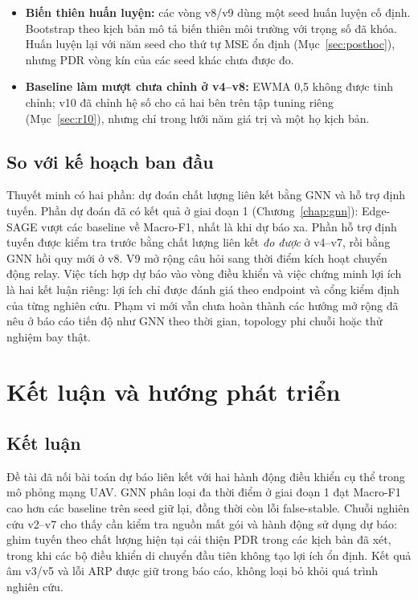 \documentclass[12pt,a4paper]{report}
\begin{document}
\begin{itemize}
  \item \textbf{Biến thiên huấn luyện:} các vòng v8/v9 dùng một seed huấn luyện cố định. Bootstrap theo kịch bản mô tả biến thiên môi trường với trọng số đã khóa. Huấn luyện lại với năm seed cho thứ tự MSE ổn định (Mục~\ref{sec:posthoc}), nhưng PDR vòng kín của các seed khác chưa được đo.
  \item \textbf{Baseline làm mượt chưa chỉnh ở v4--v8:} EWMA 0,5 không được tinh chỉnh; v10 đã chỉnh hệ số cho cả hai bên trên tập tuning riêng (Mục~\ref{sec:r10}), nhưng chỉ trong lưới năm giá trị và một họ kịch bản.
\end{itemize}

\section{So với kế hoạch ban đầu}\label{sec:plan}
Thuyết minh có hai phần: dự đoán chất lượng liên kết bằng GNN và hỗ trợ định tuyến. Phần dự đoán đã có kết quả ở giai đoạn 1 (Chương~\ref{chap:gnn}): Edge-SAGE vượt các baseline về Macro-F1, nhất là khi dự báo xa. Phần hỗ trợ định tuyến được kiểm tra trước bằng chất lượng liên kết \emph{đo được} ở v4--v7, rồi bằng GNN hồi quy mới ở v8. V9 mở rộng câu hỏi sang thời điểm kích hoạt chuyển động relay. Việc tích hợp dự báo vào vòng điều khiển và việc chứng minh lợi ích là hai kết luận riêng: lợi ích chỉ được đánh giá theo endpoint và cổng kiểm định của từng nghiên cứu. Phạm vi mới vẫn chưa hoàn thành các hướng mở rộng đã nêu ở báo cáo tiến độ như GNN theo thời gian, topology phi chuỗi hoặc thử nghiệm bay thật.

\chapter{Kết luận và hướng phát triển}\label{chap:conclusion}
\section{Kết luận}
Đề tài đã nối bài toán dự báo liên kết với hai hành động điều khiển cụ thể
trong mô phỏng mạng UAV. GNN phân loại đa thời điểm ở giai đoạn 1 đạt
Macro-F1 cao hơn các baseline trên seed giữ lại, đồng thời còn lỗi
false-stable. Chuỗi nghiên cứu v2--v7 cho thấy cần kiểm tra nguồn mất gói và
hành động sử dụng dự báo: ghim tuyến theo chất lượng hiện tại cải thiện
PDR trong các kịch bản đã xét, trong khi các bộ điều khiển di chuyển đầu
tiên không tạo lợi ích ổn định. Kết quả âm v3/v5 và lỗi ARP được giữ trong
báo cáo, không loại bỏ khỏi quá trình nghiên cứu.
\end{document}
